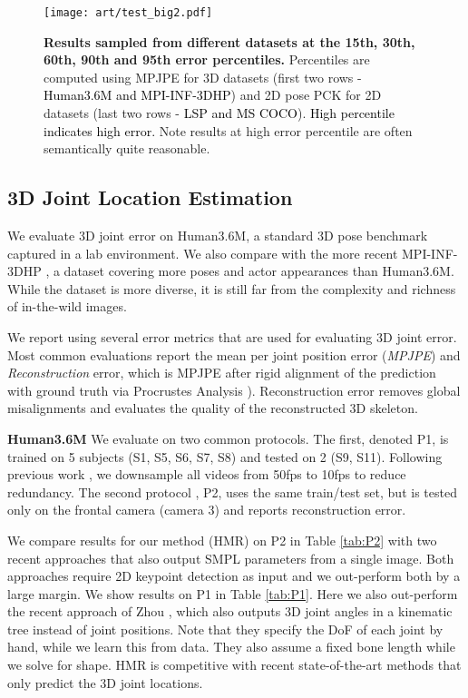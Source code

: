 \documentclass[10pt,twocolumn,letterpaper]{article}
\newcommand{\blue}[1]{\textcolor{black}{#1}}
\begin{document}
\begin{figure*}[t]
  \centering
  \texttt{[image: art/test\_big2.pdf]}
  \caption{{\small {\bf Results sampled from different datasets at the 15th, 30th, 60th, 90th
    and 95th error percentiles.} Percentiles are computed using MPJPE for 3D
  datasets (first two rows - \blue{Human3.6M and MPI-INF-3DHP}) and 2D pose PCK
  for 2D datasets (last two rows - \blue{LSP and MS COCO}). \blue{High percentile
  indicates high error.} Note results at high error percentile are often semantically quite reasonable.}}
  \label{fig:bigfig}
\end{figure*}
\subsection{3D Joint Location Estimation}
We evaluate 3D joint error on Human3.6M, a standard 3D pose benchmark captured in a
lab environment. We also compare with the more recent MPI-INF-3DHP \cite{Mehta17}, a dataset covering more poses
and actor appearances than Human3.6M. While the dataset is more
diverse, it is still far from the complexity and richness of in-the-wild images.

We report using several error metrics that are used for evaluating 3D
joint error. 
Most common evaluations report the mean per joint position error (\emph{MPJPE}) and \emph{Reconstruction} error, which is MPJPE
after rigid alignment of the prediction with ground truth via Procrustes Analysis
\cite{Gower1975}). Reconstruction error removes global misalignments and evaluates the quality of the reconstructed 3D skeleton.

\vspace{3mm}
\noindent\textbf{Human3.6M}
We evaluate on two common protocols. 
The first, denoted P1, is trained on 5
subjects (S1, S5, S6, S7, S8) and tested on 2 (S9, S11). Following previous work
\cite{Pavlakos,Rogez}, we downsample all videos from 50fps to 10fps to reduce
redundancy. The second protocol \cite{SMPLify,Tome_2017_CVPR}, P2,
uses the same train/test set, but is tested only
on the frontal camera (camera 3) and reports reconstruction error.

We compare results for our method (HMR) on P2 in Table \ref{tab:P2} with two recent approaches
\cite{SMPLify,UP} that also output SMPL parameters from a single
image. 
Both approaches require 2D keypoint detection as input and we out-perform both by a large
margin. We show results on P1 in Table \ref{tab:P1}. Here we also out-perform
the recent approach of Zhou \etal \cite{Xingyi2016}, which also outputs 3D joint
angles in a kinematic tree instead of joint positions.
Note that they specify the DoF of each joint by hand, while we learn this from data.
They also assume a fixed bone length while we solve for shape.
HMR is competitive with recent state-of-the-art methods that
only predict the 3D joint locations.
\end{document}
